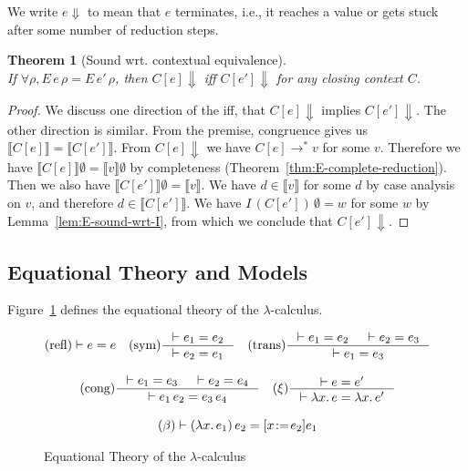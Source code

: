 \documentclass{tufte-handout}
\newcommand{\SEM}[1]{\llbracket #1 \rrbracket}
\newcommand{\LAM}[1]{\lambda #1.\,}
\newcommand{\APP}[0]{\,}
\newcommand{\by}[0]{\!:=\!}
\newtheorem{theorem}{Theorem}%
\begin{document}
We write $e\Downarrow$ to mean that $e$ terminates, i.e., it reaches a
value or gets stuck after some number of reduction steps.

\begin{theorem}[Sound wrt. contextual equivalence]\ \\
  If $\forall \rho, E\,e\,\rho = E\,e'\,\rho$, 
  then $C[e]\Downarrow$ iff $C[e']\Downarrow$ for any closing
  context $C$.
\end{theorem}
\begin{proof}
  We discuss one direction of the iff, that $C[e]\Downarrow$ implies
  $C[e']\Downarrow$. The other direction is similar.  From the
  premise, congruence gives us $\SEM{C[e]} = \SEM{C[e']}$.  From
  $C[e]\Downarrow$ we have $C[e] \longrightarrow^{*} v$ for some $v$.
  Therefore we have $\SEM{C[e]}\emptyset = \SEM{v}\emptyset$ by
  completeness (Theorem~\ref{thm:E-complete-reduction}).  Then we also
  have $\SEM{C[e']}\emptyset = \SEM{v}$.  We have $d \in \SEM{v}$ for
  some $d$ by case analysis on $v$, and therefore $d \in \SEM{C[e']}$.
  We have $I\,(C[e'])\, \emptyset = w$ for some $w$ by
  Lemma~\ref{lem:E-sound-wrt-I}, from which we conclude
  that $C[e']\Downarrow$.
\end{proof}


\subsection{Equational Theory and Models}

Figure~\ref{fig:lambda-eq} defines the equational theory of 
the $\lambda$-calculus.

\begin{figure}
\begin{gather*}
  \text{(refl)}  \vdash e = e
  \quad
  \text{(sym)}   \inference{\vdash e_1 = e_2}{\vdash e_2 = e_1}  
  \quad
  \text{(trans)}  \inference{\vdash e_1 = e_2 & \vdash e_2 = e_3}{\vdash e_1 = e_3} \\[2ex]
  \text{(cong)}  \inference{\vdash e_1 = e_3 & \vdash e_2 = e_4}
                            {\vdash e_1 \APP e_2 = e_3 \APP e_4}
   \quad
  \text{($\xi$)}  \inference{\vdash e = e'}{\vdash \LAM{x}e = \LAM{x}e'} \\[2ex]
  \text{($\beta$)}  \vdash (\LAM{x}e_1)\APP e_2 = [x\by e_2]e_1
\end{gather*}
\caption{Equational Theory of the $\lambda$-calculus}
\label{fig:lambda-eq}
\end{figure}
\end{document}
